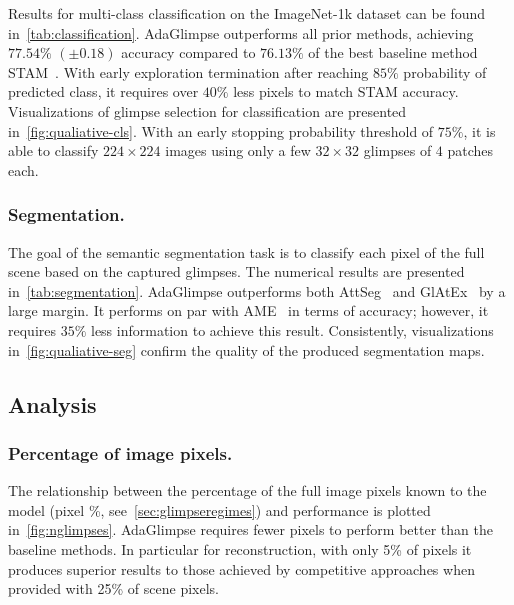 \documentclass[runningheads]{llncs}
\newcommand{\ours}[0]{AdaGlimpse}
\begin{document}
Results for multi-class classification on the ImageNet-1k dataset can be found in~\cref{tab:classification}. \ours{} outperforms all prior methods, achieving $77.54\%$ $(\pm 0.18)$ accuracy compared to $76.13\%$ of the best baseline method STAM~\cite{rangrej2022consistency}. With early exploration termination after reaching $85\%$ probability of predicted class, it requires over $40\%$ less pixels to match STAM accuracy.
Visualizations of glimpse selection for classification are presented in~\cref{fig:qualiative-cls}. With an early stopping probability threshold of $75\%$, it is able to classify $224\times224$ images using only a few $32\times32$ glimpses of $4$ patches each.

\subsubsection{Segmentation.}



The goal of the semantic segmentation task is to classify each pixel of the full scene based on the captured glimpses. The numerical results are presented in~\cref{tab:segmentation}. \ours{} outperforms both AttSeg~\cite{seifi2020attend} and GlAtEx~\cite{seifi2021glimpse} by a large margin. It performs on par with AME~\cite{pardyl2023active} in terms of accuracy; however, it requires $35\%$ less information to achieve this result. Consistently, visualizations in~\cref{fig:qualiative-seg} confirm the quality of the produced segmentation maps.



\subsection{Analysis}




\subsubsection{Percentage of image pixels.} The relationship between the percentage of the full image pixels known to the model (pixel \%, see~\cref{sec:glimpseregimes}) and performance is plotted in~\cref{fig:nglimpses}. \ours{} requires fewer pixels to perform better than the baseline methods. In particular for reconstruction, with only 5\% of pixels it produces superior results to those achieved by competitive approaches when provided with 25\% of scene pixels.


\end{document}
